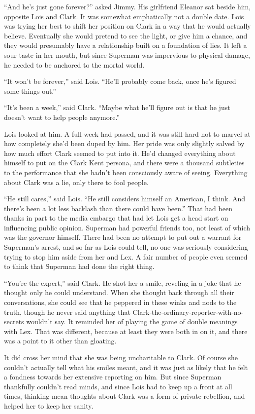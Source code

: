 \documentclass[ebook,12pt]{memoir}
\begin{document}
``And he's just gone forever?'' asked Jimmy. His girlfriend Eleanor sat
beside him, opposite Lois and Clark. It was somewhat emphatically not a
double date. Lois was trying her best to shift her position on Clark in
a way that he would actually believe. Eventually she would pretend to
see the light, or give him a chance, and they would presumably have a
relationship built on a foundation of lies. It left a sour taste in her
mouth, but since Superman was impervious to physical damage, he needed
to be anchored to the mortal world.

``It won't be forever,'' said Lois. ``He'll probably come back, once
he's figured some things out.''

``It's been a week,'' said Clark. ``Maybe what he'll figure out is that
he just doesn't want to help people anymore.''

Lois looked at him. A full week had passed, and it was still hard not to
marvel at how completely she'd been duped by him. Her pride was only
slightly salved by how much effort Clark seemed to put into it. He'd
changed everything about himself to put on the Clark Kent persona, and
there were a thousand subtleties to the performance that she hadn't been
consciously aware of seeing. Everything about Clark was a lie, only
there to fool people.

``He still cares,'' said Lois. ``He still considers himself an American,
I think. And there's been a lot less backlash than there could have
been.'' That had been thanks in part to the media embargo that had let
Lois get a head start on influencing public opinion. Superman had
powerful friends too, not least of which was the governor himself. There
had been no attempt to put out a warrant for Superman's arrest, and so
far as Lois could tell, no one was seriously considering trying to stop
him aside from her and Lex. A fair number of people even seemed to think
that Superman had done the right thing.

``You're the expert,'' said Clark. He shot her a smile, reveling in a
joke that he thought only he could understand. When she thought back
through all their conversations, she could see that he peppered in these
winks and nods to the truth, though he never said anything that
Clark‐the‐ordinary‐reporter‐with‐no‐secrets wouldn't say. It reminded
her of playing the game of double meanings with Lex. That was different,
because at least they were both in on it, and there was a point to it
other than gloating.

It did cross her mind that she was being uncharitable to Clark. Of
course she couldn't actually tell what his smiles meant, and it was just
as likely that he felt a fondness towards her extensive reporting on
him. But since Superman thankfully couldn't read minds, and since Lois
had to keep up a front at all times, thinking mean thoughts about Clark
was a form of private rebellion, and helped her to keep her sanity.
\end{document}
